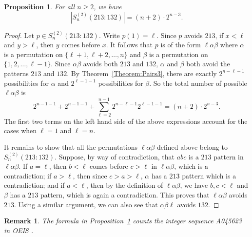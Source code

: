 \documentclass[10pt,a4paper]{amsart}
\newtheorem{proposition}[theorem]{Proposition}
\newtheorem{remark}[theorem]{Remark}
\numberwithin{equation}{section}
\begin{document}
\begin{proposition}\label{Prop:213;132}
    For all $n\geq2$, we have
    \[
    |S_n^{(2)}(213:132)|=(n+2)\cdot2^{n-3}.
    \]
\end{proposition}
\begin{proof}
    Let $p\in S_n^{(2)}(213:132)$. Write $p(1)=\ell$. Since $p$ avoids $213$, if $x<\ell$ and $y>\ell$, then $y$ comes before $x$. It follows that $p$ is of the form $\ell\alpha\beta$ where $\alpha$ is a permutation on $\{\ell+1,\ell+2,\ldots,n\}$ and $\beta$ is a permutation on $\{1,2,\ldots,\ell-1\}$. Since $\alpha\beta$ avoids both $213$ and $132$, $\alpha$ and $\beta$ both avoid the patterns $213$ and $132$. By Theorem~\ref{Theorem:Pairs3}, there are exactly $2^{n-\ell-1}$ possibilities for $\alpha$ and $2^{\ell-1-1}$ possibilities for $\beta$. So the total number of possible $\ell\alpha\beta$ is
    \[
    2^{n-1-1}+2^{n-1-1}+\sum_{\ell=2}^{n-1}2^{n-\ell-1}2^{\ell-1-1}=(n+2)\cdot2^{n-3}.
    \]
    The first two terms on the left hand side of the above expressions account for the cases when $\ell=1$ and $\ell=n$.

    It remains to show that all the permutations $\ell\alpha\beta$ defined above belong to $S_n^{(2)}(213:132)$. Suppose, by way of contradiction, that $abc$ is a $213$ pattern in $\ell\alpha\beta$. If $a=\ell$, then $b<\ell$ comes before $c>\ell$ in $\ell\alpha\beta$, which is a contradiction; if $a>\ell$, then since $c>a>\ell$, $\alpha$ has a $213$ pattern which is a contradiction; and if $a<\ell$, then by the definition of $\ell\alpha\beta$, we have $b,c<\ell$ and $\beta$ has a $213$ pattern, which is again a contradiction. This proves that $\ell\alpha\beta$ avoids $213$. Using a similar argument, we can also see that $\alpha\beta\ell$ avoids $132$.
\end{proof}

\begin{remark}
The formula in Proposition~\ref{Prop:213;132} counts the integer sequence A045623 in OEIS \cite{OEIS}.
\end{remark}
\end{document}
